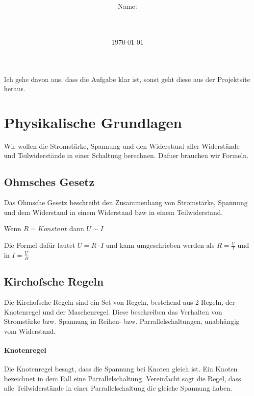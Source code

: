 \documentclass[a4paper,10pt,ngerman]{scrartcl}
\title{\textbf{\Huge\Aufgabe}}
\author{\LARGE Name: \\ 
	    \LARGE \Name\\\\}
\date{\LARGE\today}
\begin{document}
\maketitle

\setcounter{tocdepth}{5}
\tableofcontents

\vspace{0.5cm}

Ich gehe davon aus, dass die Aufgabe klar ist, sonst geht diese aus der Projektsite heraus.

\section{Physikalische Grundlagen}
\label{subsec:physik}

Wir wollen die Stromstärke, Spannung und den Widerstand aller Widerstände und Teilwiderstände in einer Schaltung berechnen. Dafuer brauchen wir Formeln.

\subsection{Ohmsches Gesetz}

Das Ohmsche Gesetz beschreibt den Zusammenhang von Stromstärke, Spannung und dem Widerstand in einem Widerstand bzw in einem Teilwiderstand.

Wenn $R = Konstant$ dann $U \sim I$

Die Formel dafür lautet $U = R \cdot I$ und kann umgeschrieben werden als $R = \frac{U}{I}$ und in $I = \frac{U}{R}$

\subsection{Kirchofsche Regeln}

Die Kirchofsche Regeln sind ein Set von Regeln, bestehend aus 2 Regeln, der Knotenregel und der Maschenregel. Diese beschreiben das Verhalten von Stromstärke bzw. Spannung in Reihen- bzw. Parrallelschaltungen, unabhängig vom Widerstand.

\paragraph{Knotenregel}

Die Knotenregel besagt, dass die Spannung bei Knoten gleich ist. Ein Knoten bezeichnet in dem Fall eine Parrallelschaltung. Vereinfacht sagt die Regel, dass alle Teilwiderstände in einer Parrallelschaltung die gleiche Spannung haben.
\end{document}
